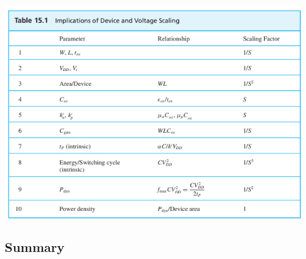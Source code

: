 \documentclass[12pt]{article}
\begin{document}
    \begin{center}
        \centerline{\includegraphics[scale=1]{figures/scaling.png}}
    \end{center}
    \subsection*{Summary}
\end{document}

